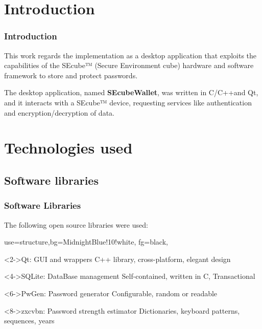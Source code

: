 \documentclass[14pt,usenames,dvipsnames]{beamer}
\begin{document}
\section{Introduction}



\begin{frame}
\frametitle{Introduction}

This work regards the implementation as a desktop application that exploits the capabilities of the SEcube™ (Secure Environment cube) hardware and software framework to store and protect passwords.

\vspace{10pt}
The desktop application, named \textbf{SEcubeWallet}, was written in C/C++and Qt, and it interacts with a SEcube™ device, requesting services like authentication and encryption/decryption of data.
\end{frame}



\section{Technologies used}

\subsection{Software libraries}
\begin{frame}
\frametitle{Software Libraries}

The following open source libraries were used:
{
 {use=structure,bg=MidnightBlue!10!white, fg=black,}

\begin{block}<2->{Qt: GUI and wrappers}
 {C++ library, cross-platform, elegant design}
\end{block}

\begin{block}<4->{SQLite: DataBase management}
 {Self-contained, written in C, Transactional}
\end{block}

\begin{block}<6->{PwGen: Password generator}
 {Configurable, random or readable}
\end{block}

\begin{block}<8->{zxcvbn: Password strength estimator}
 {Dictionaries, keyboard patterns, sequences, years}
\end{block}
}
\end{frame}
\end{document}
